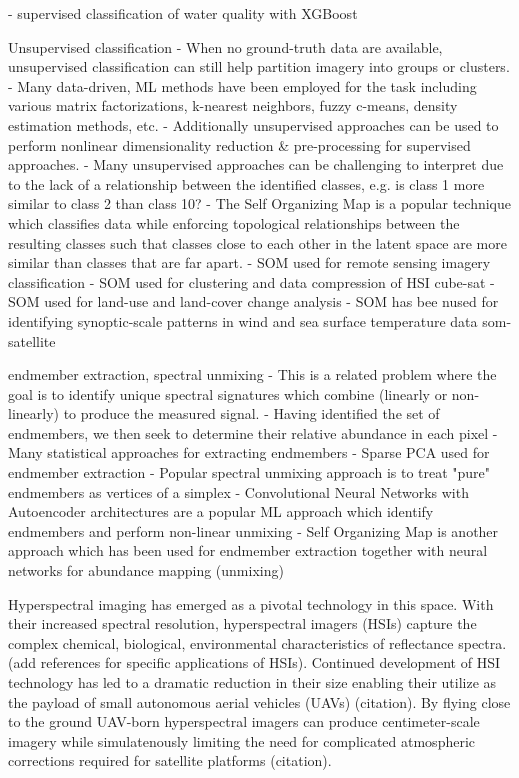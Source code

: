 \documentclass[remotesensing,article,submit,pdftex,moreauthors]{Definitions/mdpi}
\begin{document}
- supervised classification of water quality with XGBoost \cite{ghatkar2019classification}




Unsupervised classification
- When no ground-truth data are available, unsupervised classification can still help partition imagery into groups or clusters.
- Many data-driven, ML methods have been employed for the task including various matrix factorizations, k-nearest neighbors, fuzzy c-means, density estimation methods, etc. \cite{zhang2019hyperspectral}
- Additionally unsupervised approaches can be used to perform nonlinear dimensionality reduction & pre-processing for supervised approaches.
- Many unsupervised approaches can be challenging to interpret due to the lack of a relationship between the identified classes, e.g. is class 1 more similar to class 2 than class 10?
- The Self Organizing Map is a popular technique which classifies data while enforcing topological relationships between the resulting classes such that classes close to each  other in the latent space are more similar than classes that are far apart.
- SOM used for remote sensing imagery classification \cite{msom-remote-sensing}
- SOM used for clustering and data compression of HSI cube-sat \cite{danielsen2021self}
- SOM used for land-use and land-cover change analysis \cite{penfound2021analysis}
- SOM has bee nused for identifying synoptic-scale patterns in wind and sea surface temperature data {som-satellite}


endmember extraction, spectral unmixing
- This is a related problem where the goal is to identify unique spectral signatures which combine (linearly or non-linearly) to produce the measured signal.
- Having identified the set of endmembers, we then seek to determine their relative abundance in each pixel
- Many statistical approaches for extracting endmembers \cite{berman2004ice}
- Sparse PCA used for endmember extraction \cite{yousefi2016mineral}
- Popular spectral unmixing approach is to treat "pure" endmembers as vertices of a simplex \cite{plaza2012endmember, nascimento2005vertex}
- Convolutional Neural Networks with Autoencoder architectures are a popular ML approach which identify endmembers and perform non-linear unmixing \cite{palsson2020convolutional, non-negative-autoencoders, su2019daen, borsoi2019deep}
- Self Organizing Map is another approach which has been used for endmember extraction together with neural networks for abundance mapping (unmixing) \cite{cantero2004analysis}


Hyperspectral imaging has emerged as a pivotal technology in this space. With their increased spectral resolution, hyperspectral imagers (HSIs) capture the complex chemical, biological, environmental characteristics of reflectance spectra. (add references for specific applications of HSIs). Continued development of HSI technology has led to a dramatic reduction in their size enabling their utilize as the payload of small autonomous aerial vehicles (UAVs) (citation). By flying close to the ground UAV-born hyperspectral imagers can produce centimeter-scale imagery while simulatenously limiting the need for complicated atmospheric corrections required for satellite platforms (citation).
\end{document}
